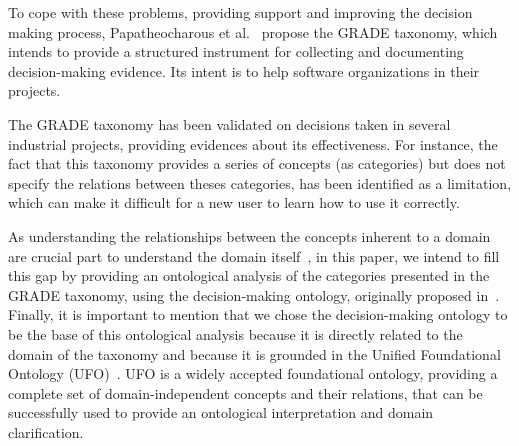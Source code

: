 To cope with these problems, providing support and improving the decision making process, Papatheocharous et al.~\cite{papatheocharous2015decision,papatheocharous2018thegrade} propose the GRADE taxonomy, which intends to provide a structured instrument for collecting and documenting decision-making evidence. Its intent is to help software organizations in their projects. 

The GRADE taxonomy has been validated on decisions taken in several %
industrial projects, providing evidences about its effectiveness. 
For instance, the fact that this taxonomy provides a series of concepts (as categories) but does not specify the relations between theses categories, has been identified as a limitation, which can make it difficult for a new user to learn how to use it correctly.

As understanding the relationships between the concepts inherent to a domain are crucial part to understand the domain itself~\cite{guarino2015discussrelationship}, in this paper, we intend to fill this gap by providing an ontological analysis of the categories presented in the GRADE taxonomy, using the decision-making ontology, originally proposed in~\cite{guizzardi2018aligning}. Finally, it is important to mention that we chose the decision-making ontology to be the base of this ontological analysis because it is directly related to the domain of the taxonomy and because it is grounded in the Unified Foundational Ontology (UFO)~\cite{guizzardi:phdthesis05,guizzardi-et-al:ideas2008}. UFO is a widely accepted foundational ontology, providing a complete set of domain-independent concepts and their relations, that can be successfully used to provide an ontological interpretation and domain clarification.


